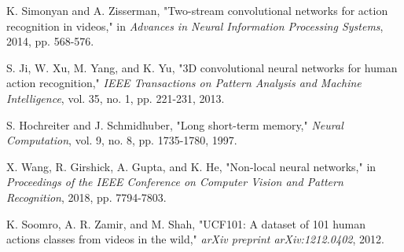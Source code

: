 \documentclass[twocolumn]{article}
\begin{document}
\begin{thebibliography}{99}
K. Simonyan and A. Zisserman, "Two-stream convolutional networks for action recognition in videos," in \textit{Advances in Neural Information Processing Systems}, 2014, pp. 568-576.

S. Ji, W. Xu, M. Yang, and K. Yu, "3D convolutional neural networks for human action recognition," \textit{IEEE Transactions on Pattern Analysis and Machine Intelligence}, vol. 35, no. 1, pp. 221-231, 2013.

S. Hochreiter and J. Schmidhuber, "Long short-term memory," \textit{Neural Computation}, vol. 9, no. 8, pp. 1735-1780, 1997.

X. Wang, R. Girshick, A. Gupta, and K. He, "Non-local neural networks," in \textit{Proceedings of the IEEE Conference on Computer Vision and Pattern Recognition}, 2018, pp. 7794-7803.

K. Soomro, A. R. Zamir, and M. Shah, "UCF101: A dataset of 101 human actions classes from videos in the wild," \textit{arXiv preprint arXiv:1212.0402}, 2012.

\end{thebibliography}
\end{document}

